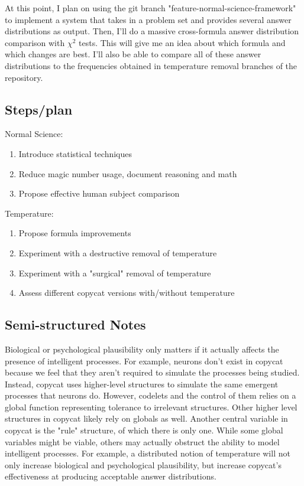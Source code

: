 \documentclass[a4paper]{article}
\begin{document}
At this point, I plan on using the git branch "feature-normal-science-framework" to implement a system that takes in a problem set and provides several answer distributions as output.
Then, I'll do a massive cross-formula answer distribution comparison with $\chi^2$ tests. This will give me an idea about which formula and which changes are best.
I'll also be able to compare all of these answer distributions to the frequencies obtained in temperature removal branches of the repository.

\subsection{Steps/plan}

Normal Science:
\begin{enumerate}
	\item Introduce statistical techniques
    \item Reduce magic number usage, document reasoning and math
    \item Propose effective human subject comparison
\end{enumerate}
Temperature:
\begin{enumerate}
	\item Propose formula improvements
    \item Experiment with a destructive removal of temperature
    \item Experiment with a "surgical" removal of temperature
    \item Assess different copycat versions with/without temperature
\end{enumerate}

\subsection{Semi-structured Notes}

Biological or psychological plausibility only matters if it actually affects the presence of intelligent processes. For example, neurons don't exist in copycat because we feel that they aren't required to simulate the processes being studied. Instead, copycat uses higher-level structures to simulate the same emergent processes that neurons do. However, codelets and the control of them relies on a global function representing tolerance to irrelevant structures. Other higher level structures in copycat likely rely on globals as well. Another central variable in copycat is the "rule" structure, of which there is only one. While some global variables might be viable, others may actually obstruct the ability to model intelligent processes. For example, a distributed notion of temperature will not only increase biological and psychological plausibility, but increase copycat's effectiveness at producing acceptable answer distributions.
\end{document}
